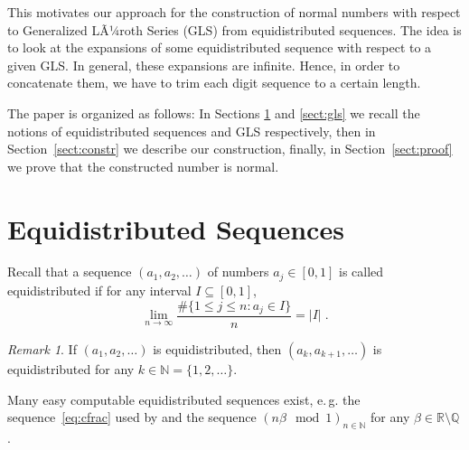\documentclass{amsart}
\theoremstyle{definition}
\theoremstyle{remark}
\newtheorem{remark}[theorem]{Remark}
\begin{document}
This motivates our approach for the construction of normal numbers with respect to Generalized LÃ¼roth Series (GLS) from equidistributed sequences.
The idea is to look at the expansions of some equidistributed sequence with respect to a given GLS. In general, these expansions are infinite. Hence, in order to concatenate them, we have to trim each digit sequence to a certain length.

The paper is organized as follows: In Sections \ref{sect:equi} and \ref{sect:gls}
we recall the notions of equidistributed sequences and GLS respectively,
then in Section~\ref{sect:constr} we describe our construction, finally,
in Section~\ref{sect:proof} we prove that the constructed number is normal.

\section{Equidistributed Sequences}\label{sect:equi}
Recall that a sequence $(a_1,a_2,\dots)$ of numbers $a_j\in[0,1]$ is called equidistributed if for any interval $I\subseteq[0,1]$,
\begin{equation}
\lim_{n\to\infty}\frac{\#\{1\le j\le n:a_j\in I\}}n = |I| \;. \label{eq:def-equi}
\end{equation}
\begin{remark}\label{re:shift}
If $(a_1,a_2,\dots)$ is equidistributed, then $(a_k,a_{k+1},\dots)$ is
equidistributed for any $k\in{\ensuremath{\mathbb N}}=\{1,2,\dots\}$.
\end{remark}
Many easy computable equidistributed sequences exist, e.\,g.
the sequence~\eqref{eq:cfrac} used by \cite{cfrac} and the sequence $(n\beta\mod1)_{n\in{\ensuremath{\mathbb N}}}$ for any $\beta\in{\ensuremath{\mathbb R}}\setminus{\ensuremath{\mathbb Q}}$ \cite{uniform}.
\end{document}
